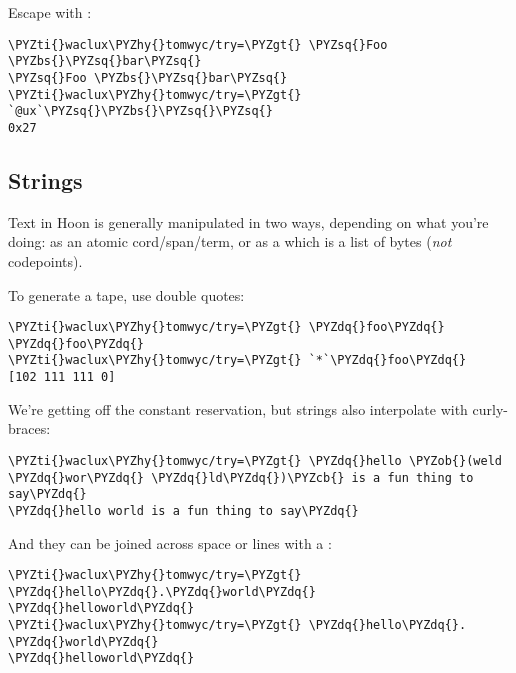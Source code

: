 Escape  with \kode{\textbackslash{}}:

\begin{framed_shaded}
\begin{Verbatim}[fontsize=\relsize{-2.5},fontseries=b,commandchars=\\\{\}]
\PYZti{}waclux\PYZhy{}tomwyc/try=\PYZgt{} \PYZsq{}Foo \PYZbs{}\PYZsq{}bar\PYZsq{}
\PYZsq{}Foo \PYZbs{}\PYZsq{}bar\PYZsq{}
\PYZti{}waclux\PYZhy{}tomwyc/try=\PYZgt{} `@ux`\PYZsq{}\PYZbs{}\PYZsq{}\PYZsq{}
0x27
\end{Verbatim}
\end{framed_shaded}

\subsection{Strings}

Text in Hoon is generally manipulated in two ways, depending on
what you're doing: as an atomic cord/span/term, or as a 
which is a list of bytes (\emph{not} codepoints).

To generate a tape, use double quotes:

\begin{framed_shaded}
\begin{Verbatim}[fontsize=\relsize{-2.5},fontseries=b,commandchars=\\\{\}]
\PYZti{}waclux\PYZhy{}tomwyc/try=\PYZgt{} \PYZdq{}foo\PYZdq{}
\PYZdq{}foo\PYZdq{}
\PYZti{}waclux\PYZhy{}tomwyc/try=\PYZgt{} `*`\PYZdq{}foo\PYZdq{}
[102 111 111 0]
\end{Verbatim}
\end{framed_shaded}

We're getting off the constant reservation, but strings also
interpolate with curly-braces:

\begin{framed_shaded}
\begin{Verbatim}[fontsize=\relsize{-2.5},fontseries=b,commandchars=\\\{\}]
\PYZti{}waclux\PYZhy{}tomwyc/try=\PYZgt{} \PYZdq{}hello \PYZob{}(weld \PYZdq{}wor\PYZdq{} \PYZdq{}ld\PYZdq{})\PYZcb{} is a fun thing to say\PYZdq{}
\PYZdq{}hello world is a fun thing to say\PYZdq{}
\end{Verbatim}
\end{framed_shaded}

And they can be joined across space or lines with a :

\begin{framed_shaded}
\begin{Verbatim}[fontsize=\relsize{-2.5},fontseries=b,commandchars=\\\{\}]
\PYZti{}waclux\PYZhy{}tomwyc/try=\PYZgt{} \PYZdq{}hello\PYZdq{}.\PYZdq{}world\PYZdq{}
\PYZdq{}helloworld\PYZdq{}
\PYZti{}waclux\PYZhy{}tomwyc/try=\PYZgt{} \PYZdq{}hello\PYZdq{}. \PYZdq{}world\PYZdq{}
\PYZdq{}helloworld\PYZdq{}
\end{Verbatim}
\end{framed_shaded}